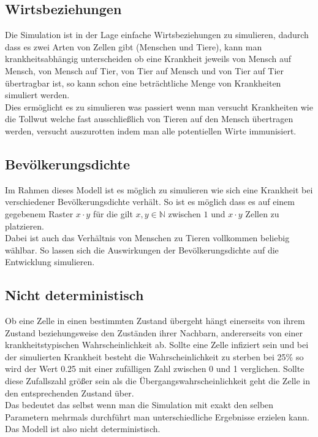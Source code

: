 \subsection*{Wirtsbeziehungen}
Die Simulation ist in der Lage einfache Wirtsbeziehungen zu simulieren, dadurch dass es zwei Arten von Zellen gibt (Menschen und Tiere), kann man krankheitsabhängig unterscheiden ob eine Krankheit jeweils von Mensch auf Mensch, von Mensch auf Tier, von Tier auf Mensch und von Tier auf Tier übertragbar ist, so kann schon eine beträchtliche Menge von Krankheiten simuliert werden.\\
Dies ermöglicht es zu simulieren was passiert wenn man versucht Krankheiten wie die Tollwut welche fast ausschließlich von Tieren auf den Mensch übertragen werden, versucht auszurotten indem man alle potentiellen Wirte immunisiert.

\subsection*{Bevölkerungsdichte}
Im Rahmen dieses Modell ist es möglich zu simulieren wie sich eine Krankheit bei verschiedener Bevölkerungsdichte verhält. So ist es möglich dass es auf einem gegebenem Raster $x\cdot y$ für die gilt $ x,y \in \mathbb{N}$ zwischen $1$ und $x\cdot y$ Zellen zu platzieren.\\
Dabei ist auch das Verhältnis von Menschen zu Tieren vollkommen beliebig wählbar. So lassen sich die Auswirkungen der Bevölkerungsdichte auf die Entwicklung simulieren.

\subsection*{Nicht deterministisch}
Ob eine Zelle in einen bestimmten Zustand übergeht hängt einerseits von ihrem Zustand beziehungsweise den Zuständen ihrer Nachbarn, andererseits von einer krankheitstypischen Wahrscheinlichkeit ab. Sollte eine Zelle infiziert sein und bei der simulierten Krankheit besteht die Wahrscheinlichkeit zu sterben bei 25\% so wird der Wert 0.25 mit einer zufälligen Zahl zwischen 0 und 1 verglichen. Sollte diese Zufallszahl größer sein als die Übergangswahrscheinlichkeit geht die Zelle in den entsprechenden Zustand über.\\
Das bedeutet das selbst wenn man die Simulation mit exakt den selben Parametern mehrmals durchführt man unterschiedliche Ergebnisse erzielen kann. Das Modell ist also nicht deterministisch.


%
%
%
%
%
